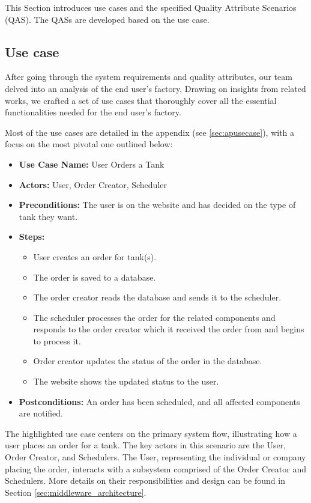 
This Section introduces use cases and the specified Quality Attribute Scenarios (QAS).
The QASs are developed based on the use case.

\subsection{Use case}
\label{sec:use_case}
After going through the system requirements and quality attributes, our team delved into an analysis of the end user's factory. Drawing on insights from related works, we crafted a set of use cases that thoroughly cover all the essential functionalities needed for the end user's factory.

Most of the use cases are detailed in the appendix (see \ref{sec:apusecase}), with a focus on the most pivotal one outlined below:

\vspace{1em}
\begin{itemize}
    \item \textbf{Use Case Name:} User Orders a Tank
    \item \textbf{Actors:} User, Order Creator, Scheduler
    \item \textbf{Preconditions:} The user is on the website and has decided on the type of tank they want.
    \item \textbf{Steps:}
    \begin{itemize}[label=--]
        \item User creates an order for tank(s).
        \item The order is saved to a database.
        \item The order creator reads the database and sends it to the scheduler.
        \item The scheduler processes the order for the related components and responds to the order creator which it received the order from and begins to process it.
        \item Order creator updates the status of the order in the database.
        \item The website shows the updated status to the user.
    \end{itemize}
    \item \textbf{Postconditions:} An order has been scheduled, and all affected components are notified.
\end{itemize}
\vspace{1em}

The highlighted use case centers on the primary system flow, illustrating how a user places an order for a tank. The key actors in this scenario are the User, Order Creator, and Schedulers. The User, representing the individual or company placing the order, interacts with a subsystem comprised of the Order Creator and Schedulers. More details on their responsibilities and design can be found in Section \ref{sec:middleware_architecture}.

